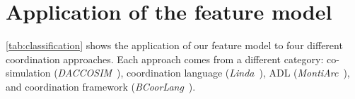 \documentclass[runningheads]{llncs}
\begin{document}
\section{Application of the feature model} \label{sec: application}
\autoref{tab:classification} shows the application of our feature model to four different coordination approaches.
Each approach comes from a different category: co-simulation (\textit{DACCOSIM}~\cite{galtierFMIBasedDistributedMultisimulation2015,dadSynthesisFeedbackDistribution2021}), coordination language (\textit{Linda}~\cite{carrieroLindaContext1989,carrieroLindaAlternativeMessagepassing1994}), ADL (\textit{MontiArc}~\cite{haberMontiArcArchitecturalModeling2014}), and coordination framework (\textit{BCoorLang}~\cite{krauterBehavioralConsistencyHeterogeneous2021,krauterBehavioralConsistencyMultimodeling2023}).
\end{document}
